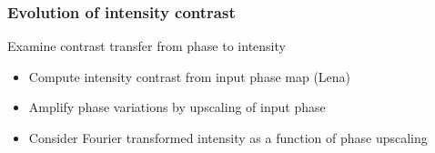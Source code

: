 \documentclass{beamer}
\renewcommand{\vec}{\mathbold}
\newcommand{\vecxi}{\vec{\xi}}
\newcommand{\abs}[1]{\left| #1 \right|} %
\newcommand{\F}{\mathcal{F}}
\def\imh{0.35\textheight}
\begin{document}
\begin{frame}
  \frametitle{Evolution of intensity contrast}
  Examine contrast transfer from phase to intensity
  \begin{itemize}
  \item Compute intensity contrast from input phase map (Lena)
  \item Amplify phase variations by upscaling of input phase
  \item Consider Fourier transformed intensity as a
    function of phase upscaling
  \end{itemize}
  \begin{columns}
\end{columns}
\end{frame}
\end{document}
